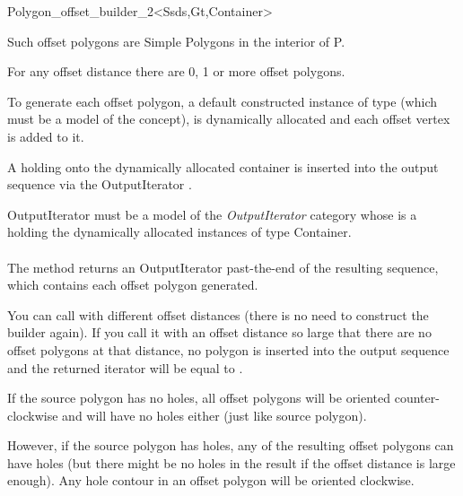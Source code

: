 \begin{ccRefClass}{Polygon_offset_builder_2<Ssds,Gt,Container>}
{Such offset polygons are Simple Polygons in the interior of P.

For any offset distance  there are 0, 1 or more offset polygons.

To generate each offset polygon, a default constructed instance of  type (which must be a model of the  concept), is dynamically allocated and each offset vertex is added to it.

A  holding onto the dynamically allocated container is inserted into the output sequence via the OutputIterator .

OutputIterator must be a model of the \textit{OutputIterator} category whose  is a  holding the dynamically allocated instances of type Container.\\\\
The method returns an OutputIterator past-the-end of the resulting sequence, which contains each offset polygon generated.

You can call  with different offset distances (there is no need to construct the builder  again). If you call it with an offset distance so large that there are no offset polygons at that distance, no polygon is inserted into the output sequence and the returned iterator will be equal to .

If the source polygon has no holes, all offset polygons will be oriented counter-clockwise and will have no holes either (just like source polygon).

However, if the source polygon has holes, any of the resulting offset polygons can have holes (but there might be no holes in the result if the offset distance is large enough). Any hole contour in an offset polygon will be oriented clockwise.}
  

\ccSeeAlso
{}\\
\\
\\
\end{ccRefClass}

